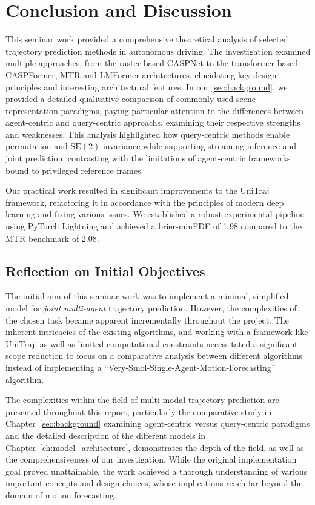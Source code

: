 \section{Conclusion and Discussion}
\label{sec:conclusion}
This seminar work provided a comprehensive theoretical analysis of selected trajectory prediction methods in autonomous driving. The investigation examined multiple approaches, from the raster-based CASPNet to the transformer-based CASPFormer, MTR and LMFormer architectures, elucidating key design principles and interesting architectural features. In our \autoref{sec:background}, we provided a detailed qualitative comparison of commonly used scene representation paradigms, paying particular attention to the differences between agent-centric and query-centric approachs, examining their respective strengths and weaknesses. This analysis highlighted how query-centric methods enable permutation and $\mathrm{SE}(2)$-invariance while supporting streaming inference and joint prediction, contrasting with the limitations of agent-centric frameworks bound to privileged reference frames.

Our practical work resulted in significant improvements to the UniTraj framework, refactoring it in accordance with the principles of modern deep learning and fixing various issues.
We established a robust experimental pipeline using PyTorch Lightning and achieved a brier-minFDE of 1.98 compared to the MTR benchmark of 2.08.


\subsection{Reflection on Initial Objectives}
\label{sec:conclusion_objectives}

The initial aim of this seminar work was to implement a minimal, simplified model for \emph{joint multi-agent} trajectory prediction. However, the complexities of the chosen task became apparent incrementally throughout the project.
The inherent intricacies of the existing algorithms, and working with a framework like UniTraj, as well as limited computational constraints necessitated a significant scope reduction to focus on a comparative analysis between different algorithms instead of implementing a ``Very-Smol-Single-Agent-Motion-Forecasting'' algorithm.

The complexities within the field of multi-modal trajectory prediction are presented throughout this report, particularly the comparative study in Chapter~\ref{sec:background} examining agent-centric versus query-centric paradigms and the detailed description of the different models in Chapter~\ref{ch:model_architecture}, demonstrates the depth of the field, as well as the comprehensiveness of our investigation. While the original implementation goal proved unattainable, the work achieved a thorough understanding of various important concepts and design choices, whose implications reach far beyond the domain of motion forecasting.

